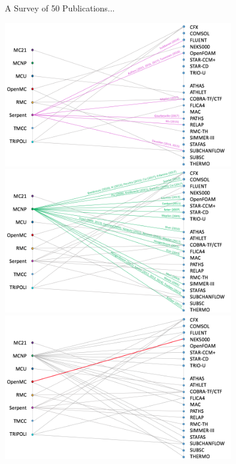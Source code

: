 \documentclass[10pt]{beamer}
\begin{document}
\begin{frame}{A Survey of 50 Publications... }
\begin{overprint}
\centering\includegraphics[width=10cm]{../Figures/history5.png}
\centering\includegraphics[width=10cm]{../Figures/history8.png}
\centering\includegraphics[width=10cm]{../Figures/history7.png}
\end{overprint}
\end{frame}
\end{document}
